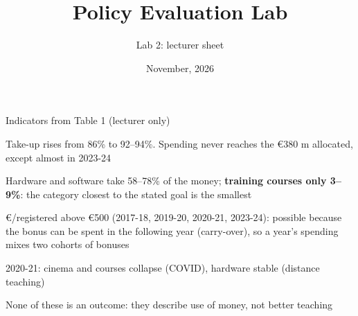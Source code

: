 \documentclass[aspectratio=169,xcolor=table]{beamer}
\title[Policy Evaluation Lab]{Policy Evaluation Lab}
\subtitle[Lab 2]{Lab 2: lecturer sheet}
\date[\pelYear]{November, 2026}
\begin{document}
\begin{frame}{Indicators from Table 1 (lecturer only)}
\centering\footnotesize
{}
\vspace{0.15cm}

\raggedright\scriptsize
\bi
  \item Take-up rises from 86\% to 92--94\%. Spending never reaches the €380 m allocated, except almost in 2023-24
  \item Hardware and software take 58--78\% of the money; \textbf{training courses only 3--9\%}: the category closest to the stated goal is the smallest
  \item €/registered above €500 (2017-18, 2019-20, 2020-21, 2023-24): possible because the bonus can be spent in the following year (carry-over), so a year's spending mixes two cohorts of bonuses
  \item 2020-21: cinema and courses collapse (COVID), hardware stable (distance teaching)
  \item None of these is an outcome: they describe use of money, not better teaching
\ei
\end{frame}
\end{document}
